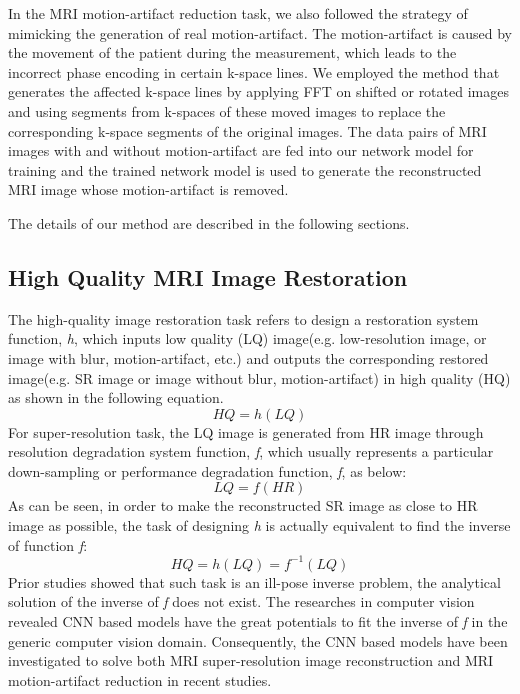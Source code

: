 \documentclass[runningheads]{llncs}
\begin{document}
In the MRI motion-artifact reduction task, we also followed the strategy of mimicking the generation of real motion-artifact. The motion-artifact is caused by the movement of the patient during the measurement, which leads to the incorrect phase encoding in certain k-space lines. We employed the method that generates the affected k-space lines by applying FFT on shifted or rotated images and using segments from k-spaces of these moved images to replace the corresponding k-space segments of the original images. The data pairs of MRI images with and without motion-artifact are fed into our network model for training and the trained network model is used to generate the reconstructed MRI image whose motion-artifact is removed.

The details of our method are described in the following sections.

\subsection{High Quality MRI Image Restoration}
The high-quality image restoration task refers to design a restoration system function, \textit{h}, which inputs low quality (LQ) image(e.g. low-resolution image, or image with blur, motion-artifact, etc.) and outputs the corresponding restored image(e.g. SR image or image without blur, motion-artifact) in high quality (HQ) as shown in the following equation.
\begin{equation}
HQ = h(LQ)
\end{equation}
For super-resolution task, the LQ image is generated from HR image through resolution degradation system function, \textit{f}, which usually represents a particular down-sampling or performance degradation function, \textit{f}, as below:
\begin{equation}
LQ = f(HR)
\end{equation}
As can be seen, in order to make the reconstructed SR image as close to HR image as possible, the task of designing \textit{h} is actually equivalent to find the inverse of function \textit{f}:
\begin{equation}
HQ = h(LQ) = f^{-1}(LQ)
\end{equation}
Prior studies showed that such task is an ill-pose inverse problem, the analytical solution of the inverse of \textit{f} does not exist. The researches in computer vision revealed CNN based models have the great potentials to fit the inverse of \textit{f} in the generic computer vision domain. Consequently, the CNN based models have been investigated to solve both MRI super-resolution image reconstruction and MRI motion-artifact reduction in recent studies. 
\end{document}
